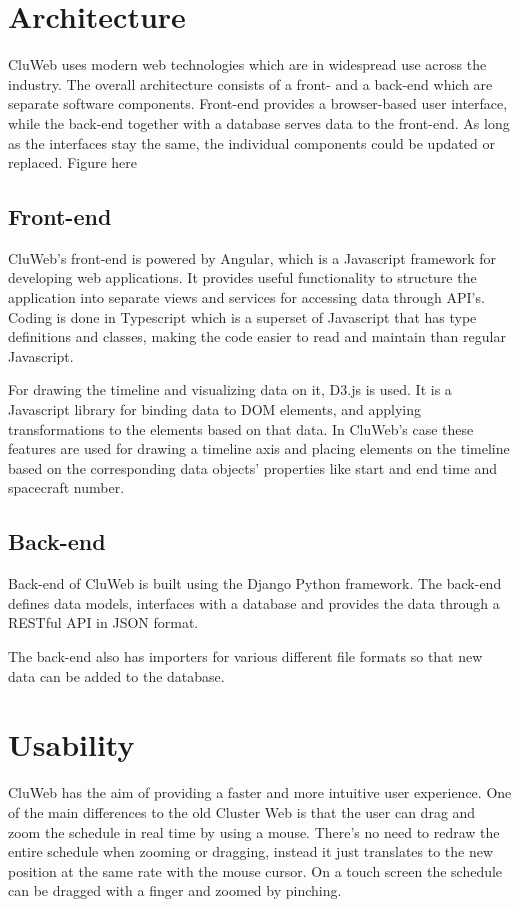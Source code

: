 \section{Architecture}
CluWeb uses modern web technologies which are in widespread use across the industry. The overall architecture consists of a front- and a back-end which are separate software components. Front-end provides a browser-based user interface, while the back-end together with a database serves data to the front-end. As long as the interfaces stay the same, the individual components could be updated or replaced.
Figure here
\subsection{Front-end}
CluWeb's front-end is powered by Angular, which is a Javascript framework for developing web applications. It provides useful functionality to structure the application into separate views and services for accessing data through API's. Coding is done in Typescript which is a superset of Javascript that has type definitions and classes, making the code easier to read and maintain than regular Javascript.

For drawing the timeline and visualizing data on it, D3.js is used. It is a Javascript library for binding data to DOM elements, and applying transformations to the elements based on that data. In CluWeb's case these features are used for drawing a timeline axis and placing elements on the timeline based on the corresponding data objects' properties like start and end time and spacecraft number.

\subsection{Back-end}
Back-end of CluWeb is built using the Django Python framework. The back-end defines data models, interfaces with a database and provides the data through a RESTful API in JSON format.

The back-end also has importers for various different file formats so that new data can be added to the database. 

\section{Usability}
CluWeb has the aim of providing a faster and more intuitive user experience. One of the main differences to the old Cluster Web is that the user can drag and zoom the schedule in real time by using a mouse. There's no need to redraw the entire schedule when zooming or dragging, instead it just translates to the new position at the same rate with the mouse cursor. On a touch screen the schedule can be dragged with a finger and zoomed by pinching.

